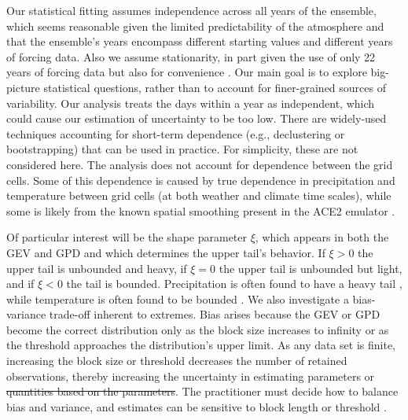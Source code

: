 \documentclass{ametsocV6.1}
\providecommand{\DIFadd}[1]{{\protect\color{blue}\uwave{#1}}} %
\providecommand{\DIFdel}[1]{{\protect\color{red}\sout{#1}}}                      %
\providecommand{\DIFaddbegin}{} %
\providecommand{\DIFaddend}{} %
\providecommand{\DIFdelbegin}{} %
\providecommand{\DIFdelend}{} %
\newcommand{\DIFscaledelfig}{0.5}
\newlength{\DIFdelgraphicswidth} %
\newlength{\DIFdelgraphicsheight} %
\newcommand{\DIFaddincludegraphics}[2][]{{\color{blue}\fbox{\DIFOincludegraphics[#1]{#2}}}} %
\newcommand{\DIFdelincludegraphics}[2][]{%
\sbox{\DIFdelgraphicsbox}{\DIFOincludegraphics[#1]{#2}}%
\settoboxwidth{\DIFdelgraphicswidth}{\DIFdelgraphicsbox} %
\settoboxtotalheight{\DIFdelgraphicsheight}{\DIFdelgraphicsbox} %
\scalebox{\DIFscaledelfig}{%
\parbox[b]{\DIFdelgraphicswidth}{\usebox{\DIFdelgraphicsbox}\\[-\baselineskip] \rule{\DIFdelgraphicswidth}{0em}}\llap{\resizebox{\DIFdelgraphicswidth}{\DIFdelgraphicsheight}{%
\setlength{\unitlength}{\DIFdelgraphicswidth}%
\begin{picture}(1,1)%
\thicklines\linethickness{2pt} %
{\color[rgb]{1,0,0}\put(0,0){\framebox(1,1){}}}%
{\color[rgb]{1,0,0}\put(0,0){\line( 1,1){1}}}%
{\color[rgb]{1,0,0}\put(0,1){\line(1,-1){1}}}%
\end{picture}%
}\hspace*{3pt}}} %
} %
\DeclareRobustCommand{\DIFaddbegin}{\DIFOaddbegin \let\includegraphics\DIFaddincludegraphics} %
\DeclareRobustCommand{\DIFaddend}{\DIFOaddend \let\includegraphics\DIFOincludegraphics} %
\DeclareRobustCommand{\DIFdelbegin}{\DIFOdelbegin \let\includegraphics\DIFdelincludegraphics} %
\DeclareRobustCommand{\DIFdelend}{\DIFOaddend \let\includegraphics\DIFOincludegraphics} %
\begin{document}
Our statistical fitting assumes independence across all years of the ensemble, which seems reasonable given the limited predictability of the atmosphere and that the ensemble's years encompass different starting values and different years of forcing data. 
Also we assume stationarity, in part given the use of only 22 years of forcing data but also for convenience \citep[see also][]{ben2020evaluation}. 
Our main goal is to explore big-picture statistical questions, rather than to account for finer-grained sources of variability. 
Our analysis treats the days within a year as independent, which could cause our estimation of uncertainty to be too low. 
There are widely-used techniques accounting for short-term dependence 
(e.g., declustering or bootstrapping) that can be used in practice. 
For simplicity, these are not considered here.
The analysis does not account for dependence between the grid cells. %
Some of this dependence is caused by true dependence in precipitation and temperature between grid cells (at both weather and climate time scales), while some is likely from the known spatial smoothing present in the ACE2 emulator \citep{watt2025ace2}.

Of particular interest will be the shape parameter $\xi$, which appears in both the GEV and GPD and which determines the upper tail's behavior.
If $\xi > 0$ the upper tail is unbounded and heavy, if $\xi = 0$ the upper tail is unbounded but light, and if $\xi < 0$ the tail is bounded.
Precipitation is often found to have a heavy tail \citep{nasem2024pmp}, while temperature is often found to be bounded \citep[e.g.,][]{philip2022rapid,bercos2022anthropogenic}.
We also investigate a bias-variance trade-off inherent to extremes.
Bias arises because the GEV or GPD become the correct distribution only as the block size increases to infinity or as the threshold approaches the distribution's upper limit.
As any data set is finite, increasing the block size or threshold decreases the number of retained observations, thereby increasing the uncertainty in estimating parameters or \DIFdelbegin \DIFdel{quantities based on the parameters}\DIFdelend \DIFaddbegin \DIFadd{quantiles}\DIFaddend .
The practitioner must decide how to balance bias and variance, and estimates can be sensitive to block length or threshold \citep[e.g.,][]{ben2020evaluation}. 
\end{document}
